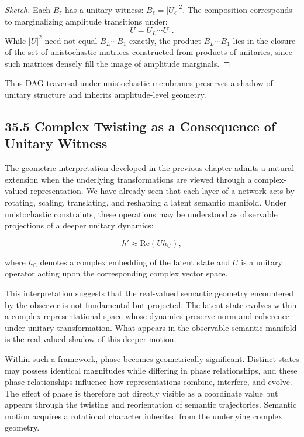 \documentclass[12pt,letterpaper]{article}
\theoremstyle{remark}
\begin{document}
\begin{proof}[Sketch]
Each $B_\ell$ has a unitary witness: $B_\ell = |U_\ell|^2$.  
The composition corresponds to marginalizing amplitude transitions under:
\[
U = U_L \cdots U_1.
\]
While $|U|^2$ need not equal $B_L \cdots B_1$ exactly, the product $B_L \cdots B_1$ lies in the closure of the set of unistochastic matrices constructed from products of unitaries, since such matrices densely fill the image of amplitude marginals.  
\end{proof}

Thus DAG traversal under unistochastic membranes preserves a shadow of unitary structure and inherits amplitude-level geometry.

\subsection{35.5 Complex Twisting as a Consequence of Unitary Witness}

The geometric interpretation developed in the previous chapter admits a natural extension when the underlying transformations are viewed through a complex-valued representation. We have already seen that each layer of a network acts by rotating, scaling, translating, and reshaping a latent semantic manifold. Under unistochastic constraints, these operations may be understood as observable projections of a deeper unitary dynamics:

\[
h' \approx \mathrm{Re}(U h_{\mathbb{C}}),
\]

where $h_{\mathbb{C}}$ denotes a complex embedding of the latent state and $U$ is a unitary operator acting upon the corresponding complex vector space.

This interpretation suggests that the real-valued semantic geometry encountered by the observer is not fundamental but projected. The latent state evolves within a complex representational space whose dynamics preserve norm and coherence under unitary transformation. What appears in the observable semantic manifold is the real-valued shadow of this deeper motion.

Within such a framework, phase becomes geometrically significant. Distinct states may possess identical magnitudes while differing in phase relationships, and these phase relationships influence how representations combine, interfere, and evolve. The effect of phase is therefore not directly visible as a coordinate value but appears through the twisting and reorientation of semantic trajectories. Semantic motion acquires a rotational character inherited from the underlying complex geometry.
\end{document}
